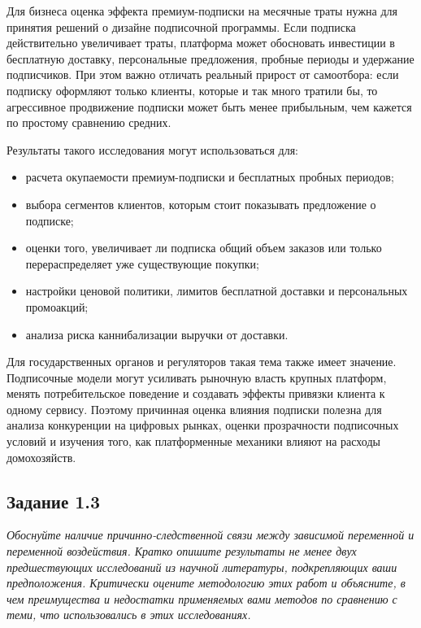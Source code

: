 \documentclass[11pt]{article}
\newenvironment{tasktext}
      {\begin{tcolorbox}[breakable, colback=black!3, colframe=black!28,
        boxrule=0.4pt, arc=1.5mm, left=7pt, right=7pt, top=5pt, bottom=5pt,
        before skip=0.35em, after skip=0.75em]\itshape}
      {\end{tcolorbox}}
\providecommand{\tightlist}{%
      \setlength{\itemsep}{0pt}\setlength{\parskip}{0pt}}
\begin{document}
Для бизнеса оценка эффекта премиум-подписки на месячные траты нужна для
принятия решений о дизайне подписочной программы. Если подписка
действительно увеличивает траты, платформа может обосновать инвестиции в
бесплатную доставку, персональные предложения, пробные периоды и
удержание подписчиков. При этом важно отличать реальный прирост от
самоотбора: если подписку оформляют только клиенты, которые и так много
тратили бы, то агрессивное продвижение подписки может быть менее
прибыльным, чем кажется по простому сравнению средних.

Результаты такого исследования могут использоваться для:

\begin{itemize}
\tightlist
\item
  расчета окупаемости премиум-подписки и бесплатных пробных периодов;
\item
  выбора сегментов клиентов, которым стоит показывать предложение о
  подписке;
\item
  оценки того, увеличивает ли подписка общий объем заказов или только
  перераспределяет уже существующие покупки;
\item
  настройки ценовой политики, лимитов бесплатной доставки и персональных
  промоакций;
\item
  анализа риска каннибализации выручки от доставки.
\end{itemize}

Для государственных органов и регуляторов такая тема также имеет
значение. Подписочные модели могут усиливать рыночную власть крупных
платформ, менять потребительское поведение и создавать эффекты привязки
клиента к одному сервису. Поэтому причинная оценка влияния подписки
полезна для анализа конкуренции на цифровых рынках, оценки прозрачности
подписочных условий и изучения того, как платформенные механики влияют
на расходы домохозяйств.

\subsection{Задание 1.3}\label{ux437ux430ux434ux430ux43dux438ux435-1.3}

\begin{tasktext}
Обоснуйте наличие причинно-следственной связи между зависимой переменной
и переменной воздействия. Кратко опишите результаты не менее двух
предшествующих исследований из научной литературы, подкрепляющих ваши
предположения. Критически оцените методологию этих работ и объясните, в
чем преимущества и недостатки применяемых вами методов по сравнению с
теми, что использовались в этих исследованиях.
\end{tasktext}
\end{document}
